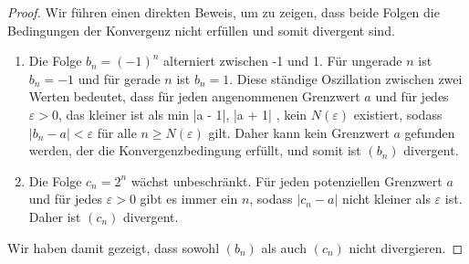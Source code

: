 \documentclass{article}
\theoremstyle{definition}
\theoremstyle{remark}
\begin{document}
\begin{proof}
	Wir führen einen direkten Beweis, um zu zeigen, dass beide Folgen die Bedingungen der Konvergenz nicht erfüllen und somit divergent sind.

	\begin{enumerate}
		\item Die Folge \(b_n = (-1)^n\) alterniert zwischen -1 und 1. Für ungerade \(n\) ist \(b_n = -1\) und für gerade \(n\) ist \(b_n = 1\). Diese ständige Oszillation zwischen zwei Werten bedeutet, dass für jeden angenommenen Grenzwert \(a\) und für jedes \(\varepsilon > 0\), das kleiner ist als min{ |a - 1|, |a + 1| }, kein \(N(\varepsilon)\) existiert, sodass \(|b_n - a| < \varepsilon\) für alle \(n \geq N(\varepsilon)\) gilt. Daher kann kein Grenzwert \(a\) gefunden werden, der die Konvergenzbedingung erfüllt, und somit ist \((b_n)\) divergent.

		\item Die Folge \(c_n = 2^n\) wächst unbeschränkt. Für jeden potenziellen Grenzwert \(a\) und für jedes \(\varepsilon > 0\) gibt es immer ein \(n\), sodass \(|c_n - a|\) nicht kleiner als \(\varepsilon\) ist. Daher ist \((c_n)\) divergent.
	\end{enumerate}

	Wir haben damit gezeigt, dass sowohl \((b_n)\) als auch \((c_n)\) nicht divergieren.
\end{proof}
\end{document}
